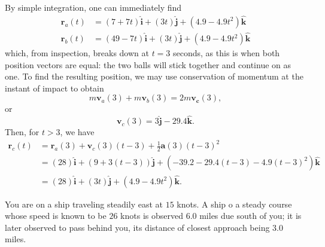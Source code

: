\documentclass[../feynman-lectures-on-physics.tex]{subfiles}
\begin{document}
\begin{questions}
	\begin{solution}
		By simple integration, one can immediately find
		\begin{align*}
			\mathbf{r}_a(t) &= (7 + 7t)\hat{\mathbf{i}} + (3t)\hat{\mathbf{j}} + (4.9 - 4.9t^2)\hat{\mathbf{k}} \\
			\mathbf{r}_b(t) &= (49 - 7t)\hat{\mathbf{i}} + (3t)\hat{\mathbf{j}} + (4.9-4.9t^2)\hat{\mathbf{k}}
		\end{align*}
		which, from inspection, breaks down at $t = 3$ seconds, as this is when
		both position vectors are equal: the two balls will stick together and
		continue on as one. To find the resulting position, we may use
		conservation of momentum at the instant of impact to obtain
		\[
		m\mathbf{v}_a(3) + m\mathbf{v}_b(3) = 2m\mathbf{v_c}(3),
		\]
		or
		\[
		\mathbf{v}_c(3) = 3\hat{\mathbf{j}} - 29.4\hat{\mathbf{k}}.
		\]
		Then, for $t>3$, we have
		\begin{align*}
			\mathbf{r}_c(t) &= \mathbf{r}_a(3) + \mathbf{v}_c(3)(t - 3) + \frac{1}{2}\mathbf{a}(3)(t-3)^2 \\
			&= (28)\hat{\mathbf{i}} + (9 + 3(t-3))\hat{\mathbf{j}} + (-39.2 - 29.4(t-3) - 4.9(t-3)^2)\hat{\mathbf{k}} \\
			&= (28)\hat{\mathbf{i}} + (3t)\hat{\mathbf{j}} + (4.9-4.9t^2)\hat{\mathbf{k}}.
		\end{align*}
	\end{solution}
	
	\question You are on a ship traveling steadily east at $15$ knots. A ship
	o a steady course whose speed is known to be $26$ knots is observed
	$6.0$ miles due south of you; it is later observed to pass behind you,
	its distance of closest approach being $3.0$ miles.

\end{questions}
\end{document}
